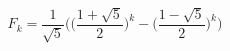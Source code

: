 \documentclass[preview]{standalone}
\begin{document}
\begin{center}
$$F_k = \frac{1}{\sqrt{5}} \big( \big(\frac{1 + \sqrt{5}}{2} \big)^k - \big(\frac{1 - \sqrt{5}}{2})^k \big)$$
\end{center}
\end{document}
